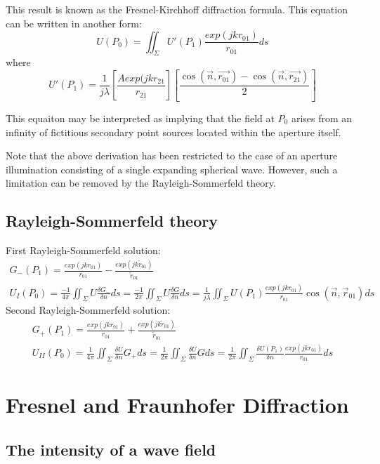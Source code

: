 \documentclass[../main.tex]{subfiles}
\begin{document}
	This result is known as the Fresnel-Kirchhoff diffraction formula. This equation can be written in another form:
	\begin{equation}
	U(P_0)=\iint_\Sigma{U'(P_1)\frac{exp(jkr_{01})}{r_{01}}}ds
	\end{equation}
	where
	\begin{equation}
	U'(P_1)=\frac{1}{j\lambda}\left[\frac{A exp(jkr_{21}}{r_{21}}\right]\left[\frac{\cos(\vec{n},\vec{r_{01}})-\cos(\vec{n},\vec{r_{21}})}{2}\right]
	\end{equation}

	This equaiton may be interpreted as implying that the field at $P_0$ arises from an infinity of fictitious secondary point sources located within the aperture itself.

	Note that the above derivation has been restricted to the case of an aperture illumination consisting of a single expanding spherical wave. However, such a limitation can be removed by the Rayleigh-Sommerfeld theory.

	\subsection{Rayleigh-Sommerfeld theory}
	First Rayleigh-Sommerfeld solution:
	\begin{align}
	G_-(P_1)=\frac{exp(jkr_{01})}{r_{01}}-\frac{exp(jk\tilde{r}_{01})}{\tilde{r}_{01}}\\
	U_I(P_0)=\frac{-1}{4\pi}\iint_\Sigma{U\frac{\delta G_-}{\delta n}}ds=\frac{-1}{2\pi}\iint_\Sigma{U\frac{\delta G}{\delta n}}ds=\frac{1}{j\lambda}\iint_{\Sigma} U(P_1)\frac{exp(jkr_{01})}{r_{01}}\cos(\vec{n},\vec{r}_{01})ds\label{first R-S solution}
	\end{align}
	Second Rayleigh-Sommerfeld solution:
	\begin{align}
	G_+(P_1)=\frac{exp(jkr_{01})}{r_{01}}+\frac{exp(jk\tilde{r}_{01})}{\tilde{r}_{01}}\\
	U_{II}(P_0)=\frac{1}{4\pi}\iint_\Sigma{\frac{\delta U}{\delta n}}G_+ds=\frac{1}{2\pi}\iint_\Sigma{\frac{\delta U}{\delta n}}Gds=\frac{1}{2\pi}\iint_\Sigma{\frac{\delta U(P_1)}{\delta n}}\frac{exp(jkr_{01})}{r_{01}}ds
	\end{align}
	
	\section{Fresnel and Fraunhofer Diffraction}
	\subsection{The intensity of a wave field}
\end{document}
